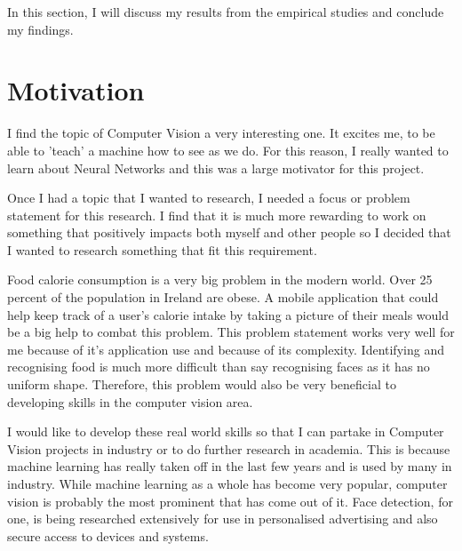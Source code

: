 In this section, I will discuss my results from the empirical studies and conclude my findings.


\section{Motivation}
I find the topic of Computer Vision a very interesting one.
It excites me, to be able to 'teach' a machine how to see as we do.
For this reason, I really wanted to learn about Neural Networks
and this was a large motivator for this project.

Once I had a topic that I wanted to research, I needed a focus or problem statement for this research.
I find that it is much more rewarding to work on something that positively
impacts both myself and other people so I decided that I wanted to research
something that fit this requirement.

Food calorie consumption is a very big problem in the modern world.
Over 25 percent of the population in Ireland are obese.
A mobile application that could help keep track of a user's calorie intake by taking a picture of their meals would be a big help to combat this problem.
This problem statement works very well for me because of it's application use and because of its complexity.
Identifying and recognising food is much more difficult than say recognising faces as it has no uniform shape.
Therefore, this problem would also be very beneficial to developing skills in the computer vision area.

I would like to develop these real world skills so that I can partake in
Computer Vision projects in industry or to do further research in academia. This
is because machine learning has really taken off in the last few years and is
used by many in industry. While machine learning as a whole has become very
popular, computer vision is probably the most prominent that has come out of it.
Face detection, for one, is being researched extensively for use in personalised
advertising and also secure access to devices and systems.
